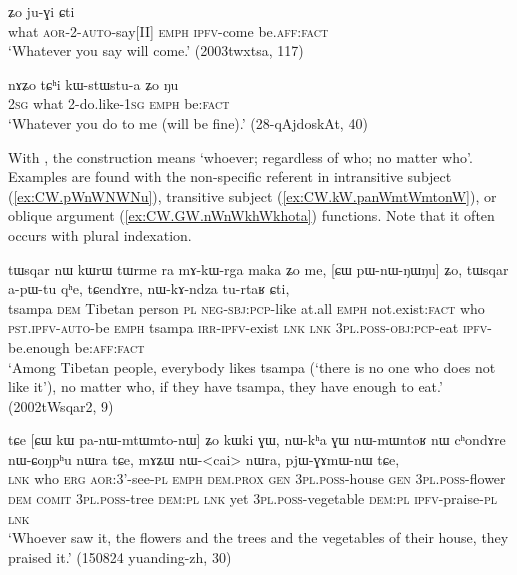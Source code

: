 \begin{exe}
\ex \label{ex:tChi.tAtWnWtWtWt}
 ʑo ju-ɣi ɕti \\
what \textsc{aor}-2-\textsc{auto}-say[II] \textsc{emph} \textsc{ipfv}-come be.\textsc{aff}:\textsc{fact} \\
\glt  `Whatever you say will come.' (2003twxtsa, 117)
\end{exe}  

\begin{exe}
\ex \label{ex:tChi.kWstWstua}
\gll nɤʑo tɕʰi kɯ-stɯ\redp{}stu-a ʑo ŋu \\
\textsc{2sg} what 2-do.like-\textsc{1sg} \textsc{emph} be:\textsc{fact} \\
\glt `Whatever you do to me (will be fine).' (28-qAjdoskAt, 40)
\end{exe}


With , the construction means `whoever; regardless of who; no matter who'. Examples are found with the non-specific referent in intransitive subject (\ref{ex:CW.pWnWNWNu}), transitive subject (\ref{ex:CW.kW.panWmtWmtonW}), or oblique argument (\ref{ex:CW.GW.nWnWkhWkhota}) functions. Note that it often occurs with plural indexation.

\begin{exe}
\ex \label{ex:CW.pWnWNWNu}
\gll tɯsqar nɯ kɯrɯ tɯrme ra mɤ-kɯ-rga maka ʑo me, [ɕɯ pɯ-nɯ-ŋɯ\redp{}ŋu] ʑo, tɯsqar a-pɯ-tu qʰe, tɕendɤre, nɯ-kɤ-ndza tu-rtaʁ ɕti, \\
tsampa \textsc{dem} Tibetan person \textsc{pl} \textsc{neg}-\textsc{sbj}:\textsc{pcp}-like at.all \textsc{emph} not.exist:\textsc{fact} who  \textsc{pst}.\textsc{ipfv}-\textsc{auto}-be \textsc{emph} tsampa \textsc{irr}-\textsc{ipfv}-exist \textsc{lnk} \textsc{lnk} \textsc{3pl}.\textsc{poss}-\textsc{obj}:\textsc{pcp}-eat \textsc{ipfv}-be.enough be:\textsc{aff}:\textsc{fact} \\
\glt `Among Tibetan people, everybody likes tsampa (`there is no one who does not like it'), no matter who, if they have tsampa, they have enough to eat.' (2002tWsqar2, 9)
\end{exe}

\begin{exe}
\ex \label{ex:CW.kW.panWmtWmtonW}
\gll tɕe [ɕɯ kɯ pa-nɯ-mtɯ\redp{}mto-nɯ] ʑo kɯki ɣɯ, nɯ-kʰa ɣɯ nɯ-mɯntoʁ nɯ cʰondɤre nɯ-ɕoŋpʰu nɯra tɕe, mɤʑɯ nɯ-<cai> nɯra, pjɯ-ɣɤmɯ-nɯ tɕe, \\
\textsc{lnk} who \textsc{erg} \textsc{aor}:3'-see-\textsc{pl} \textsc{emph} \textsc{dem}.\textsc{prox} \textsc{gen} \textsc{3pl}.\textsc{poss}-house \textsc{gen} \textsc{3pl}.\textsc{poss}-flower \textsc{dem} \textsc{comit} \textsc{3pl}.\textsc{poss}-tree \textsc{dem}:\textsc{pl} \textsc{lnk} yet \textsc{3pl}.\textsc{poss}-vegetable \textsc{dem}:\textsc{pl} \textsc{ipfv}-praise-\textsc{pl} \textsc{lnk} \\
\glt `Whoever saw it, the flowers and the trees and the vegetables of their house, they praised it.' (150824 yuanding-zh, 30)
\end{exe}


